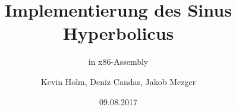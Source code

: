 % 

\documentclass[mathserif]{beamer}

\usepackage[ngerman]{babel}
\usepackage[utf8]{inputenc}
\usepackage{listings}
\usepackage{tabularx}
\usepackage{graphicx}
\title{Implementierung des Sinus Hyperbolicus}
\subtitle{in x86-Assembly}
\author
{Kevin Holm, Deniz Candas, Jakob Mezger}
\date{09.08.2017}
[x86masm]{Assembler} %
{morekeywords={CDQE,CQO,CMPSQ,CMPXCHG16B,JRCXZ,LODSQ,MOVSXD, %
		POPFQ,PUSHFQ,SCASQ,STOSQ,IRETQ,RDTSCP,SWAPGS, %
		rax,rdx,rcx,rbx,rsi,rdi,rsp,rbp, %
		r8,r8d,r8w,r8b,r9,r9d,r9w,r9b, %
		r10,r10d,r10w,r10b,r11,r11d,r11w,r11b, %
		r12,r12d,r12w,r12b,r13,r13d,r13w,r13b, %
		r14,r14d,r14w,r14b,r15,r15d,r15w,r15b}} %



